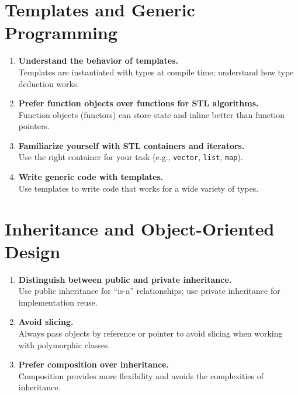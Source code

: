 \section{Templates and Generic Programming}
\begin{enumerate}
    \item \textbf{Understand the behavior of templates.} \\
    Templates are instantiated with types at compile time; understand how type deduction works.

    \item \textbf{Prefer function objects over functions for STL algorithms.} \\
    Function objects (functors) can store state and inline better than function pointers.

    \item \textbf{Familiarize yourself with STL containers and iterators.} \\
    Use the right container for your task (e.g., \texttt{vector}, \texttt{list}, \texttt{map}).

    \item \textbf{Write generic code with templates.} \\
    Use templates to write code that works for a wide variety of types.
\end{enumerate}

\section{Inheritance and Object-Oriented Design}
\begin{enumerate}
    \item \textbf{Distinguish between public and private inheritance.} \\
    Use public inheritance for ``is-a'' relationships; use private inheritance for implementation reuse.

    \item \textbf{Avoid slicing.} \\
    Always pass objects by reference or pointer to avoid slicing when working with polymorphic classes.

    \item \textbf{Prefer composition over inheritance.} \\
    Composition provides more flexibility and avoids the complexities of inheritance.
\end{enumerate}


